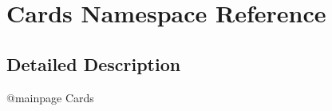 \hypertarget{namespaceCards}{\section{Cards Namespace Reference}
\label{namespaceCards}
}


\subsection{Detailed Description}
\begin{DoxyVerb}    @mainpage Cards\end{DoxyVerb}
 